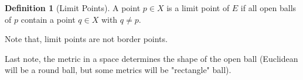 \documentclass[12pt]{article}
\theoremstyle{definition}
\newtheorem{definition}{Definition}[section]
\theoremstyle{plain}
\begin{document}
\begin{definition}[Limit Points]
A point $p\in X$ is a limit point of $E$ if all open balls of $p$ contain a point $q\in X$ with $q\neq p$.
\end{definition}

\begin{note}
Note that, limit points are not border points.
\end{note}

\begin{note}
Last note, the metric in a space determines the shape of the open ball (Euclidean will be a round ball, but some metrics will be "rectangle" ball).
\end{note}
\end{document}
